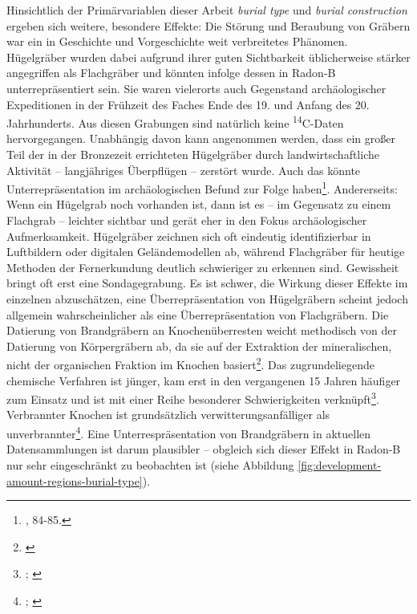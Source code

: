 \documentclass[openany,twoside,twocolumn]{book}
\let\rmarkdownfootnote\footnote%
\def\footnote{\protect\rmarkdownfootnote}
\begin{document}
Hinsichtlich der Primärvariablen dieser Arbeit \emph{burial type} und \emph{burial construction} ergeben sich weitere, besondere Effekte: Die Störung und Beraubung von Gräbern war ein in Geschichte und Vorgeschichte weit verbreitetes Phänomen. Hügelgräber wurden dabei aufgrund ihrer guten Sichtbarkeit üblicherweise stärker angegriffen als Flachgräber und könnten infolge dessen in Radon-B unterrepräsentiert sein. Sie waren vielerorts auch Gegenstand archäologischer Expeditionen in der Frühzeit des Faches Ende des 19. und Anfang des 20. Jahrhunderts. Aus diesen Grabungen sind natürlich keine \textsuperscript{14}C-Daten hervorgegangen. Unabhängig davon kann angenommen werden, dass ein großer Teil der in der Bronzezeit errichteten Hügelgräber durch landwirtschaftliche Aktivität -- langjähriges Überpflügen -- zerstört wurde. Auch das könnte Unterrepräsentation im archäologischen Befund zur Folge haben\footnote{\textcite{harding_european_2000}, 84-85.}. Andererseits: Wenn ein Hügelgrab noch vorhanden ist, dann ist es -- im Gegensatz zu einem Flachgrab -- leichter sichtbar und gerät eher in den Fokus archäologischer Aufmerksamkeit. Hügelgräber zeichnen sich oft eindeutig identifizierbar in Luftbildern oder digitalen Geländemodellen ab, während Flachgräber für heutige Methoden der Fernerkundung deutlich schwieriger zu erkennen sind. Gewissheit bringt oft erst eine Sondagegrabung. Es ist schwer, die Wirkung dieser Effekte im einzelnen abzuschätzen, eine Überrepräsentation von Hügelgräbern scheint jedoch allgemein wahrscheinlicher als eine Überrepräsentation von Flachgräbern. Die Datierung von Brandgräbern an Knochenüberresten weicht methodisch von der Datierung von Körpergräbern ab, da sie auf der Extraktion der mineralischen, nicht der organischen Fraktion im Knochen basiert\footnote{\textcite{lanting_dating_2001}}. Das zugrundeliegende chemische Verfahren ist jünger, kam erst in den vergangenen 15 Jahren häufiger zum Einsatz und ist mit einer Reihe besonderer Schwierigkeiten verknüpft\footnote{\textcite{olsen_characterisation_2008}; \textcite{strydonck_14c_2009}}. Verbrannter Knochen ist grundsätzlich verwitterungsanfälliger als unverbrannter\footnote{\textcite{kalsbeek_preservation_2006}; \textcite{stiner_differential_1995}}. Eine Unterrespräsentation von Brandgräbern in aktuellen Datensammlungen ist darum plausibler -- obgleich sich dieser Effekt in Radon-B nur sehr eingeschränkt zu beobachten ist (siehe Abbildung \ref{fig:development-amount-regions-burial-type}).
\end{document}
